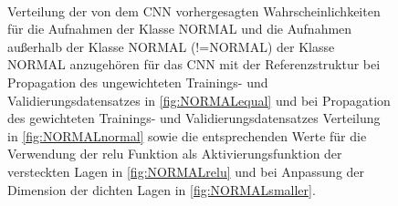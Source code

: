 \begin{figure}
 \centering
  \begin{subfigure}[Ungewichteter Datensatz]{
 \texttt{[image: fig/Appendix\_CNN/NORMALornotlogequal.pdf]} \label{fig:NORMALequal}}
  \end{subfigure}
 \begin{subfigure}[Gewichteter Datensatz]{
 \texttt{[image: fig/Appendix\_CNN/NORMALornotlognormal.pdf]}\label{fig:NORMALnormal}}
  \end{subfigure} \\
  \begin{subfigure}[relu statt elu als Aktivierungsfunktion]{
 \texttt{[image: fig/Appendix\_CNN/NORMALornotlogrelu.pdf]}\label{fig:NORMALrelu}}
  \end{subfigure}
 \begin{subfigure}[Verkleinerte Dimensionen der dichten Lagen]{
 \texttt{[image: fig/Appendix\_CNN/NORMALornotlogsmaller.pdf]}\label{fig:NORMALsmaller}}
  \end{subfigure}
  \caption{Verteilung der von dem CNN vorhergesagten Wahrscheinlichkeiten für die Aufnahmen der Klasse NORMAL und die Aufnahmen außerhalb der Klasse NORMAL (!=NORMAL) der Klasse NORMAL anzugehören für das CNN mit der Referenzstruktur bei Propagation des ungewichteten Trainings- und Validierungsdatensatzes in \ref{fig:NORMALequal} und bei Propagation des gewichteten Trainings- und Validierungsdatensatzes Verteilung in \ref{fig:NORMALnormal} sowie die entsprechenden Werte für die Verwendung der relu Funktion als Aktivierungsfunktion der versteckten Lagen in \ref{fig:NORMALrelu} und bei Anpassung der Dimension der dichten Lagen in \ref{fig:NORMALsmaller}.}
\end{figure}
\setcounter{subfigure}{0}


